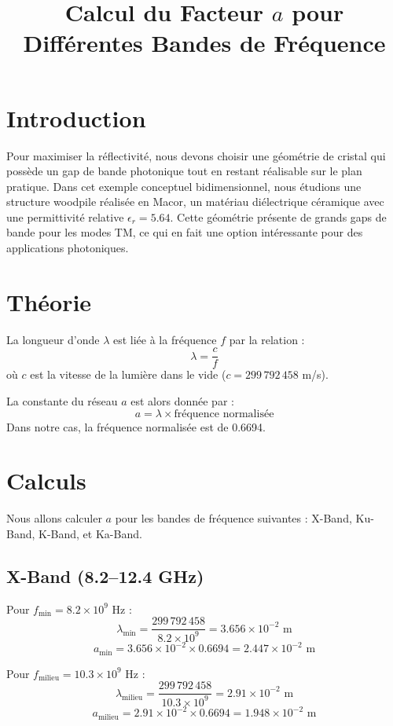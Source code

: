 \documentclass{article}
\begin{document}
\title{Calcul du Facteur \( a \) pour Différentes Bandes de Fréquence}
\author{}
\date{}
\maketitle

\section{Introduction}
Pour maximiser la réflectivité, nous devons choisir une géométrie de cristal qui possède un gap de bande photonique tout en restant réalisable sur le plan pratique. Dans cet exemple conceptuel bidimensionnel, nous étudions une structure woodpile réalisée en Macor, un matériau diélectrique céramique avec une permittivité relative \( \epsilon_r = 5.64 \). Cette géométrie présente de grands gaps de bande pour les modes TM, ce qui en fait une option intéressante pour des applications photoniques.

\section{Théorie}
La longueur d'onde \( \lambda \) est liée à la fréquence \( f \) par la relation :
\[
\lambda = \frac{c}{f}
\]
où \( c \) est la vitesse de la lumière dans le vide (\( c = 299\,792\,458 \) m/s).

La constante du réseau \( a \) est alors donnée par :
\[
a = \lambda \times \text{fréquence normalisée}
\]
Dans notre cas, la fréquence normalisée est de 0.6694.

\section{Calculs}
Nous allons calculer \( a \) pour les bandes de fréquence suivantes : X-Band, Ku-Band, K-Band, et Ka-Band.

\subsection{X-Band (8.2–12.4 GHz)}
Pour \( f_{\text{min}} = 8.2 \times 10^9 \) Hz :
\[
\lambda_{\text{min}} = \frac{299\,792\,458}{8.2 \times 10^9} = 3.656 \times 10^{-2} \text{ m}
\]
\[
a_{\text{min}} = 3.656 \times 10^{-2} \times 0.6694 = 2.447 \times 10^{-2} \text{ m}
\]

Pour \( f_{\text{milieu}} = 10.3 \times 10^9 \) Hz :
\[
\lambda_{\text{milieu}} = \frac{299\,792\,458}{10.3 \times 10^9} = 2.91 \times 10^{-2} \text{ m}
\]
\[
a_{\text{milieu}} = 2.91 \times 10^{-2} \times 0.6694 = 1.948 \times 10^{-2} \text{ m}
\]
\end{document}
